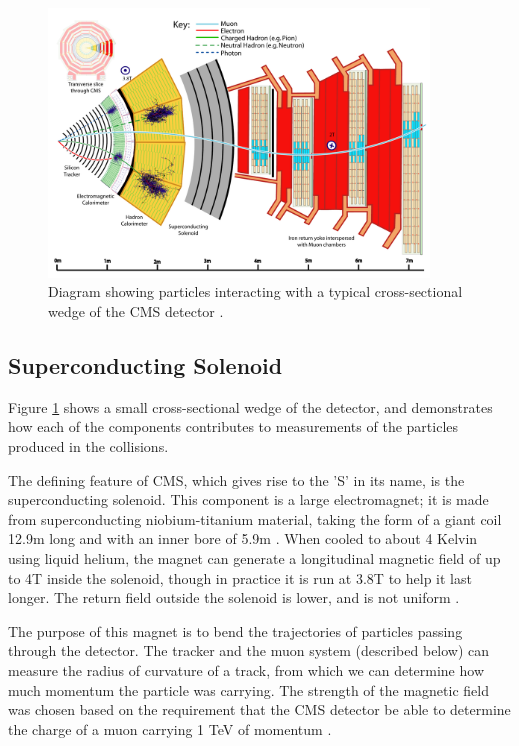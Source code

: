 \begin{figure}[htb]
\centering
\includegraphics[width=0.9\textwidth]{figures/cms-wedge.pdf}
\caption[Diagram showing particles interacting with a typical
cross-sectional wedge of the CMS detector.]{Diagram showing particles
  interacting with a typical cross-sectional wedge of the CMS detector
  \cite{particleflow}.}
\label{fig:cms:wedge}
\end{figure}

\subsection{Superconducting Solenoid}
\label{ssec:cms:components:magnet}

Figure \ref{fig:cms:wedge} shows a small cross-sectional wedge
of the detector, and demonstrates how each of the components
contributes to measurements of the particles produced in the
collisions.

The defining feature of CMS, which gives rise to the 'S' in its name,
is the superconducting solenoid. This component is a large
electromagnet; it is made from superconducting niobium-titanium
material, taking the form of a giant coil 12.9m long and with an inner
bore of 5.9m \cite{tdr}. When cooled to about 4 Kelvin using liquid helium,
the magnet can generate a longitudinal magnetic
field of up to 4T inside the solenoid, though in practice it is run at
3.8T to help it last longer. The return field outside the
solenoid is lower, and is not uniform \cite{accelexper}.

The purpose of this magnet is to bend the trajectories of particles
passing through the detector. The tracker and the muon system
(described below) can measure the radius of curvature of a track, from
which we can determine how much momentum the particle was
carrying. The strength of the magnetic field was chosen based on
the requirement that the CMS detector be able to determine the charge
of a muon carrying 1 TeV of momentum \cite{tdr}.


